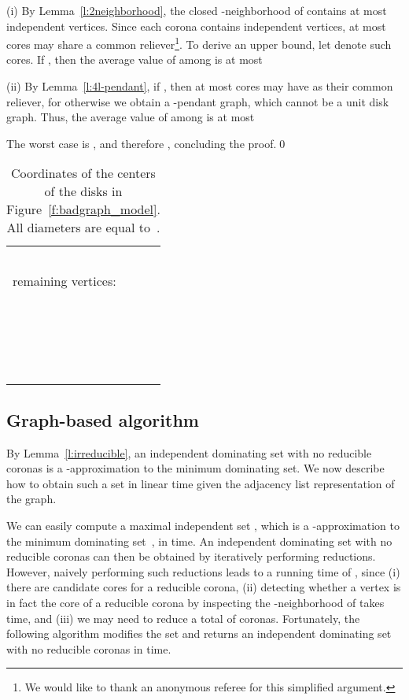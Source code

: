 \documentclass[preprint,12pt]{elsarticle}
\begin{document}
\begin{pf}
(i)  By Lemma~\ref{l:2neighborhood}, the closed -neighborhood of  contains at most  independent vertices. Since each corona contains  independent vertices, at most  cores may share a common reliever\footnote{We would like to thank an anonymous referee for this simplified argument.}. To derive an upper bound, let  denote such cores. If , then the average value of  among  is at most
 

(ii)  By Lemma~\ref{l:4l-pendant}, if , then at most  cores  may have  as their common reliever, for otherwise we obtain \linebreak a -pendant graph, which cannot be a unit disk graph. Thus, the average value of  among  is at most


The worst case is , and therefore , concluding the proof.\qed
\end{pf}

\begin{table}
\begin{center}
\begin{tabular}{|lll|}
\hline
  & & \\
  &  & \\
  &  & \\
  &  & \\
  &  & \\
\multicolumn{3}{|l|}{remaining vertices:}\\
~ &  &  \\
~ &  &  \\
~ &  &  \\
~ &  &  \\
\hline
\end{tabular}
\caption{\label{t:coordinates} Coordinates of the centers of the disks in Figure~\ref{f:badgraph_model}. All diameters are equal to~.}
\end{center}
\end{table}

\subsection{Graph-based algorithm} \label{s:graph-alg}

By Lemma~\ref{l:irreducible}, an independent dominating set with no reducible coronas is a -approximation to the minimum dominating set. We now describe how to obtain such a set in linear time given the adjacency list representation of the graph.

We can easily compute a maximal independent set , which is a -approx\-i\-ma\-tion to the minimum dominating set~\cite{heuristics}, in  time. An independent dominating set with no reducible coronas can then be obtained by iteratively performing reductions. However, naively performing such reductions leads to a running time of , since (i) there are  candidate cores for a reducible corona, (ii) detecting whether a vertex  is in fact the core of a reducible corona by inspecting the -neighborhood of  takes  time, and (iii) we may need to reduce a total of  coronas. Fortunately, the following algorithm modifies the set  and returns an independent dominating set with no reducible coronas in  time.
\end{document}
